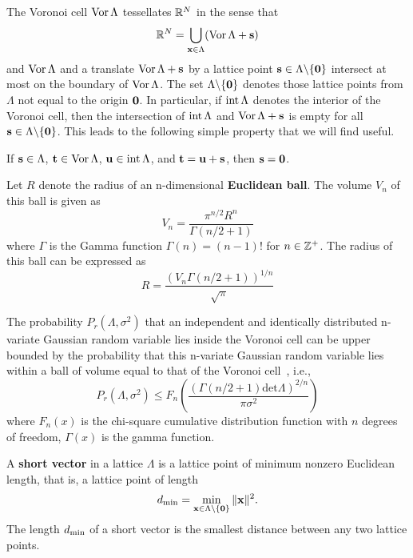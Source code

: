 The Voronoi cell $\operatorname{Vor}\Lambda$ tessellates ${\mathbb R}^N$ in the sense that
\[
{\mathbb R}^N = \bigcup_{\mathbf{x} \in \Lambda} (\operatorname{Vor}\Lambda + \mathbf{s})
\]
and $\operatorname{Vor}\Lambda$ and a translate $\operatorname{Vor}\Lambda + \mathbf{s}$ by a lattice point $\mathbf{s} \in \Lambda\backslash  \{\boldsymbol{0}\}$ intersect at most on the boundary of $\operatorname{Vor}\Lambda$.  The set $\Lambda \backslash  \{\boldsymbol{0}\}$ denotes those lattice points from $\Lambda$ not equal to the origin $\boldsymbol{0}$.  In particular, if $\operatorname{int}\Lambda$ denotes the interior of the Voronoi cell, then the intersection of $\operatorname{int}\Lambda$ and $\operatorname{Vor} \Lambda + \mathbf{s}$ is empty for all $\mathbf{s} \in \Lambda \backslash  \{\boldsymbol{0}\}$.  %
This leads to the following simple property that we will find useful.

\begin{remark}\label{remarksimpleintvor}
If $\mathbf{s} \in \Lambda$, $\mathbf{t} \in \operatorname{Vor}\Lambda$, $\mathbf{u} \in \operatorname{int}\Lambda$, and $\mathbf{t} = \mathbf{u} + \mathbf{s}$, then $\mathbf{s} = \boldsymbol{0}$.
\end{remark}


Let $R$ denote the radius of an n-dimensional \textbf{Euclidean ball}. The volume $V_n$ of this ball is given as
\[
V_n = \frac{\pi^{n/2}R^n}{\Gamma(n/2 + 1)} 
\]
where $\Gamma$ is the Gamma function $\Gamma(n)=(n-1)!$ for $n\in {\mathbb Z}^+$. The radius of this ball can be expressed as
\[
R =  \dfrac{\left (V_n \Gamma(n/2 + 1)\right)^{1/n}}{\sqrt{\pi}} 
\]

The probability $P_r(\Lambda, \sigma^2)$ that an independent and identically distributed n-variate Gaussian random variable lies inside the Voronoi cell can be upper bounded by the probability that this n-variate Gaussian random variable lies within a ball of volume equal to that of the Voronoi cell~\cite[Sec.~IV.C]{Hassibi_GPS_1998}, i.e.,
\begin{equation}\label{ch2:upperBoundUsingSphere}
P_r(\Lambda, \sigma^2) \leq F_n \left( \frac{ \left (  \Gamma(n/2 + 1)  \text{det}\Lambda  \right)^{2/n} } {\pi \sigma^2} \right)
\end{equation}
where $F_n(x)$ is the chi-square cumulative distribution function with $n$ degrees of freedom,  $\Gamma(x)$ is the gamma function.

A \textbf{short vector} in a lattice $\Lambda$ is a lattice point of minimum nonzero Euclidean length, that is, a lattice point of length
\[
d_{\text{min}} =  \min_{\mathbf{x} \in \Lambda \backslash \{ \boldsymbol{0} \} } \| \mathbf{x} \|^2.
\]   
The length $d_{\text{min}}$ of a short vector is the smallest distance between any two lattice points. 


